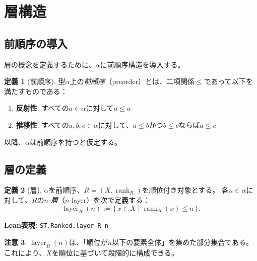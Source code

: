 \documentclass[12pt,a4paper]{ltjsarticle}
\theoremstyle{definition}
\newtheorem{definition}{定義}[section]
\newtheorem{remark}[definition]{注意}
\begin{document}
\section{層構造}
\label{sec:layers}

\subsection{前順序の導入}

層の概念を定義するために、$\alpha$に前順序構造を導入する。

\begin{definition}[前順序]
型$\alpha$上の\emph{前順序}（preorder）とは、二項関係$\le$であって以下を満たすものである：
\begin{enumerate}[label=(\roman*)]
  \item \textbf{反射性}: すべての$a \in \alpha$に対して$a \le a$
  \item \textbf{推移性}: すべての$a, b, c \in \alpha$に対して、$a \le b$かつ$b \le c$ならば$a \le c$
\end{enumerate}
\end{definition}

以降、$\alpha$は前順序を持つと仮定する。

\subsection{層の定義}

\begin{definition}[層]\label{def:layer}
$\alpha$を前順序、$R=(X,\operatorname{rank}_R)$を順位付き対象とする。
各$n\in \alpha$に対して、$R$の\emph{$n$-層}（$n$-layer）を次で定義する：
\[
  \operatorname{layer}_R(n) := \{\,x \in X \mid \operatorname{rank}_R(x) \le n\,\}.
\]

\medskip
\noindent
\textbf{Lean表現:} \texttt{ST.Ranked.layer R n}
\end{definition}

\begin{remark}
$\operatorname{layer}_R(n)$は、「順位が$n$以下の要素全体」を集めた部分集合である。
これにより、$X$を順位に基づいて段階的に構成できる。
\end{remark}
\end{document}

